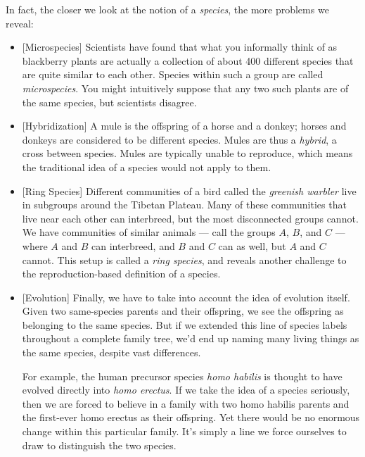 \documentclass[11pt, oneside]{article}   	%
\begin{document}
In fact, the closer we look at the notion of a {\em species}, the more problems
we reveal:
\begin{itemize}
    \item{} [Microspecies] Scientists have found that what you informally
        think of as blackberry plants are actually a
        collection of about 400
        different species that are quite similar to each other.
        Species within such a group are called {\em microspecies}.
        You might intuitively
        suppose that any two such plants are of the same species,
        but scientists disagree.
    \item{} [Hybridization] A mule is the offspring of a horse and a donkey;
        horses and donkeys are considered to be different species.
        Mules are thus a {\em hybrid}, a cross between species.
        Mules
        are typically unable to reproduce, which means the
        traditional idea of a species would not apply to them.
    \item{} [Ring Species] Different communities of a bird called the
        {\em greenish warbler} live in subgroups around the Tibetan Plateau.
        Many of these communities that live near each other can interbreed, but
        the most disconnected groups cannot. We have
        communities of similar animals --- call the groups $A$, $B$, and $C$ ---
        where $A$ and $B$ can interbreed, and $B$ and $C$ can as well, but $A$
        and $C$ cannot. This setup is called a {\em ring species}, and reveals
        another challenge to the reproduction-based definition of a species.
    \item{} [Evolution] Finally, we have to take into account the idea of
        evolution itself.
        Given two same-species parents and their offspring, we see the
        offspring as belonging to the same species.
        But if we extended this line of
        species labels throughout a complete family tree, we'd end up naming
        many living things as the same species, despite vast differences.

        For example, the human precursor species {\em homo habilis} is
        thought to have evolved directly into {\em homo erectus}.
        If we take the idea of a species seriously,
        then we are forced to believe in a family
        with two homo habilis parents and
        the first-ever homo erectus as their offspring.
        Yet there would be no enormous
        change within this particular family.
        It's simply a line we force
        ourselves to draw to distinguish the two species.
\end{itemize}
\end{document}
